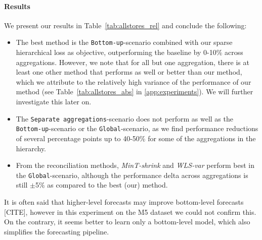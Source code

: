 \documentclass[preprint, 3p, times, twocolumn]{elsarticle}
\begin{document}
  \paragraph{Results} We present our results in Table~\ref{tab:allstores_rel} and conclude the following:
  \begin{itemize}
    \item The best method is the \texttt{Bottom-up}-scenario combined with our sparse hierarchical loss as objective, outperforming the baseline by 0-10\% across aggregations. However, we note that for all but one aggregation, there is at least one other method that performs as well or better than our method, which we attribute to the relatively high variance of the performance of our method (see Table~\ref{tab:allstores_abs} in \ref{app:experiments}). We will further investigate this later on. 
    \item The \texttt{Separate aggregations}-scenario does not perform as well as the \texttt{Bottom-up}-scenario or the \texttt{Global}-scenario, as we find performance reductions of several percentage points up to 40-50\% for some of the aggregations in the hierarchy. 
    \item From the reconciliation methods, \textit{MinT-shrink} and \textit{WLS-var} perform best in the \texttt{Global}-scenario, although the performance delta across aggregations is still $\pm$5\% as compared to the best (our) method.
  \end{itemize}
  It is often said that higher-level forecasts may improve bottom-level forecasts [CITE], however in this experiment on the M5 dataset we could not confirm this. On the contrary, it seems better to learn only a bottom-level model, which also simplifies the forecasting pipeline.
\end{document}
